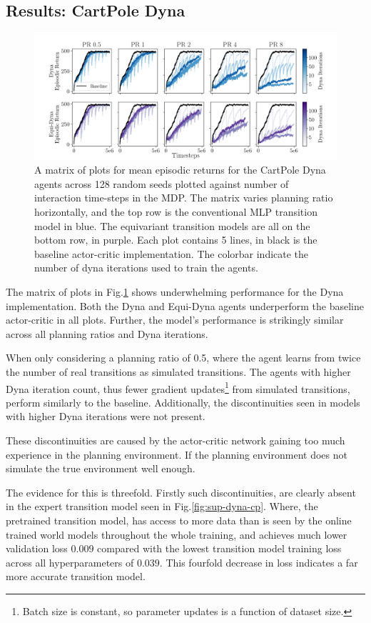 \subsection{Results: CartPole Dyna}
\begin{figure}[h!]
	\centering
	\includegraphics[width=\textwidth]{Figures/dyna_sweep_cp.png}
	\caption{A matrix of plots for mean episodic returns for the CartPole Dyna agents across 128 random seeds
		plotted against number of interaction time-steps in the MDP. The matrix varies planning ratio horizontally, and the top row is the conventional MLP transition model in blue. The equivariant transition models are all on the bottom row, in purple. Each plot contains 5 lines, in black is the baseline actor-critic implementation. The colorbar indicate the number of dyna iterations used to train the agents.}
	\label{fig:cp_dyna}
\end{figure}

The matrix of plots in Fig.\ref{fig:cp_dyna} shows underwhelming performance for the Dyna implementation. Both the Dyna and Equi-Dyna agents underperform the baseline actor-critic in all plots. Further, the model's performance is strikingly similar across all planning ratios and Dyna iterations.

When only considering a planning ratio of 0.5, where the agent learns from twice the number of real transitions as simulated transitions. The agents with higher Dyna iteration count, thus fewer gradient updates\footnote{Batch size is constant, so parameter updates is a function of dataset size.} from simulated transitions, perform similarly to the baseline. Additionally, the discontinuities seen in models with higher Dyna iterations were not present.

These discontinuities are caused by the actor-critic network gaining too much experience in the planning environment. If the planning environment does not simulate the true environment well enough.

The evidence for this is threefold. Firstly such discontinuities, are clearly absent in the expert transition model seen in Fig.\ref{fig:sup-dyna-cp}. Where, the pretrained transition model, has access to more data than is seen by the online trained world models throughout the whole training, and achieves much lower validation loss $0.009$ compared with the lowest transition model training loss across all hyperparameters of $0.039$. This fourfold decrease in loss indicates a far more accurate transition model.

